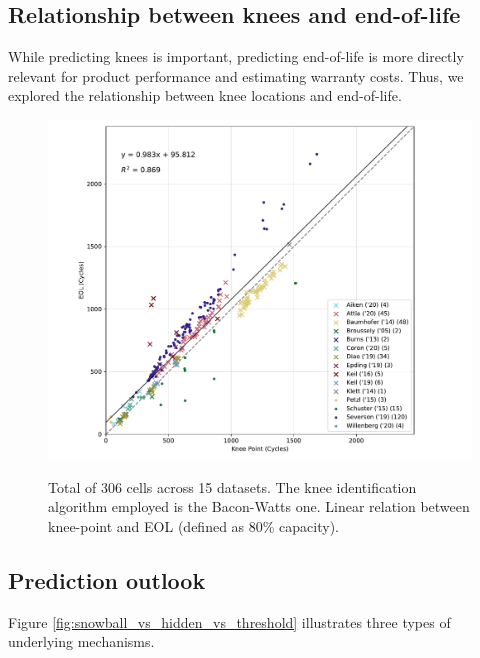 \documentclass{article}
\begin{document}
\subsection{Relationship between knees and end-of-life}

While predicting knees is important, predicting end-of-life is more directly relevant for product performance and estimating warranty costs. Thus, we explored the relationship between knee locations and end-of-life.

\begin{figure}[ht]
\centering
\includegraphics[width=0.8\linewidth]{figures/AcrossDatasetsknee-to-EOL}
  \label{fig:kneepoint2EOL}
\caption{Total of 306 cells across 15 datasets. The knee identification algorithm employed is the Bacon-Watts one. Linear relation between knee-point and EOL (defined as 80\% capacity).}
\label{fig:knees2EOL}
\end{figure}

\subsection{Prediction outlook}

Figure \ref{fig:snowball_vs_hidden_vs_threshold} illustrates three types of underlying mechanisms.
\end{document}
